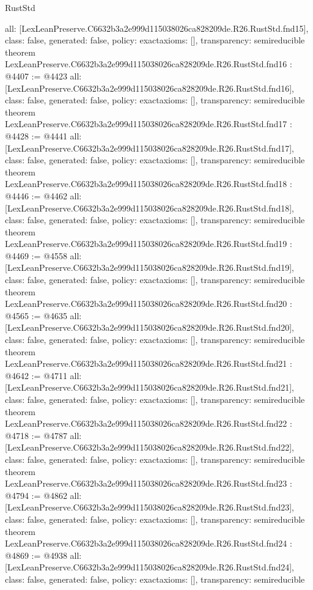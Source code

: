 \begin{lexlean}{RustStd}
\begin{coremodule}
{  all: [LexLeanPreserve.C6632b3a2e999d115038026ca828209de.R26.RustStd.fnd15],
  class: false,
  generated: false,
  policy: exact{axioms: []},
  transparency: semireducible
}
theorem LexLeanPreserve.C6632b3a2e999d115038026ca828209de.R26.RustStd.fnd16 : @4407 := @4423 {
  all: [LexLeanPreserve.C6632b3a2e999d115038026ca828209de.R26.RustStd.fnd16],
  class: false,
  generated: false,
  policy: exact{axioms: []},
  transparency: semireducible
}
theorem LexLeanPreserve.C6632b3a2e999d115038026ca828209de.R26.RustStd.fnd17 : @4428 := @4441 {
  all: [LexLeanPreserve.C6632b3a2e999d115038026ca828209de.R26.RustStd.fnd17],
  class: false,
  generated: false,
  policy: exact{axioms: []},
  transparency: semireducible
}
theorem LexLeanPreserve.C6632b3a2e999d115038026ca828209de.R26.RustStd.fnd18 : @4446 := @4462 {
  all: [LexLeanPreserve.C6632b3a2e999d115038026ca828209de.R26.RustStd.fnd18],
  class: false,
  generated: false,
  policy: exact{axioms: []},
  transparency: semireducible
}
theorem LexLeanPreserve.C6632b3a2e999d115038026ca828209de.R26.RustStd.fnd19 : @4469 := @4558 {
  all: [LexLeanPreserve.C6632b3a2e999d115038026ca828209de.R26.RustStd.fnd19],
  class: false,
  generated: false,
  policy: exact{axioms: []},
  transparency: semireducible
}
theorem LexLeanPreserve.C6632b3a2e999d115038026ca828209de.R26.RustStd.fnd20 : @4565 := @4635 {
  all: [LexLeanPreserve.C6632b3a2e999d115038026ca828209de.R26.RustStd.fnd20],
  class: false,
  generated: false,
  policy: exact{axioms: []},
  transparency: semireducible
}
theorem LexLeanPreserve.C6632b3a2e999d115038026ca828209de.R26.RustStd.fnd21 : @4642 := @4711 {
  all: [LexLeanPreserve.C6632b3a2e999d115038026ca828209de.R26.RustStd.fnd21],
  class: false,
  generated: false,
  policy: exact{axioms: []},
  transparency: semireducible
}
theorem LexLeanPreserve.C6632b3a2e999d115038026ca828209de.R26.RustStd.fnd22 : @4718 := @4787 {
  all: [LexLeanPreserve.C6632b3a2e999d115038026ca828209de.R26.RustStd.fnd22],
  class: false,
  generated: false,
  policy: exact{axioms: []},
  transparency: semireducible
}
theorem LexLeanPreserve.C6632b3a2e999d115038026ca828209de.R26.RustStd.fnd23 : @4794 := @4862 {
  all: [LexLeanPreserve.C6632b3a2e999d115038026ca828209de.R26.RustStd.fnd23],
  class: false,
  generated: false,
  policy: exact{axioms: []},
  transparency: semireducible
}
theorem LexLeanPreserve.C6632b3a2e999d115038026ca828209de.R26.RustStd.fnd24 : @4869 := @4938 {
  all: [LexLeanPreserve.C6632b3a2e999d115038026ca828209de.R26.RustStd.fnd24],
  class: false,
  generated: false,
  policy: exact{axioms: []},
  transparency: semireducible
}
\end{coremodule}
\end{lexlean}
